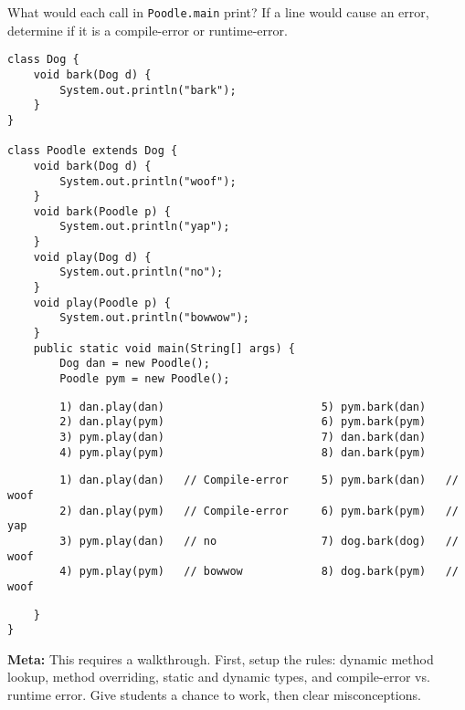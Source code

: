 \begin{blocksection}
\question What would each call in \lstinline$Poodle.main$ print? If a line
would cause an error, determine if it is a compile-error or runtime-error.

\begin{lstlisting}
class Dog {
    void bark(Dog d) {
        System.out.println("bark");
    }
}

class Poodle extends Dog {
    void bark(Dog d) {
        System.out.println("woof");
    }
    void bark(Poodle p) {
        System.out.println("yap");
    }
    void play(Dog d) {
        System.out.println("no");
    }
    void play(Poodle p) {
        System.out.println("bowwow");
    }
    public static void main(String[] args) {
        Dog dan = new Poodle();
        Poodle pym = new Poodle();
\end{lstlisting}
\ifprintanswers\else
\begin{lstlisting}
        1) dan.play(dan)                        5) pym.bark(dan)
        2) dan.play(pym)                        6) pym.bark(pym)
        3) pym.play(dan)                        7) dan.bark(dan)
        4) pym.play(pym)                        8) dan.bark(pym)
\end{lstlisting}
\fi
\begin{solution}
\begin{lstlisting}
        1) dan.play(dan)   // Compile-error     5) pym.bark(dan)   // woof
        2) dan.play(pym)   // Compile-error     6) pym.bark(pym)   // yap
        3) pym.play(dan)   // no                7) dog.bark(dog)   // woof
        4) pym.play(pym)   // bowwow            8) dog.bark(pym)   // woof
\end{lstlisting}
\end{solution}
\begin{lstlisting}
    }
}
\end{lstlisting}
\end{blocksection}

\begin{solution}
\textbf{Meta:} This requires a walkthrough. First, setup the rules: dynamic
method lookup, method overriding, static and dynamic types, and compile-error
vs. runtime error. Give students a chance to work, then clear misconceptions.
\end{solution}
